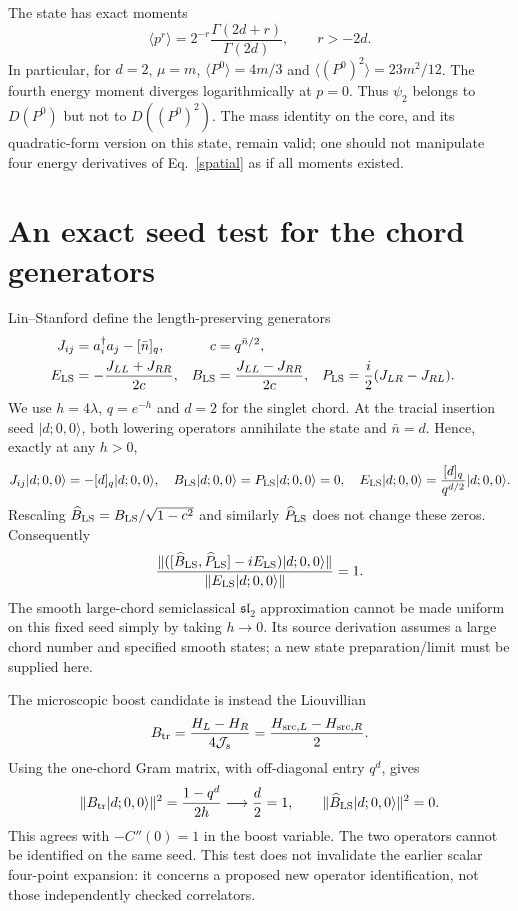 \documentclass[11pt,a4paper]{article}
\newcommand{\Js}{\mathcal J_s}
\begin{document}
The state has exact moments
\begin{equation}
 \langle p^r\rangle=2^{-r}\frac{\Gamma(2d+r)}{\Gamma(2d)},
 \qquad r>-2d.
\end{equation}
In particular, for $d=2$, $\mu=m$,
$\langle P^0\rangle=4m/3$ and
$\langle(P^0)^2\rangle=23m^2/12$. The fourth energy moment diverges
logarithmically at $p=0$. Thus $\psi_2$ belongs to $D(P^0)$ but not to
$D((P^0)^2)$. The mass identity on the core, and its quadratic-form
version on this state, remain valid; one should not manipulate four
energy derivatives of Eq.~\eqref{spatial} as if all moments existed.

\newpage
\section{An exact seed test for the chord generators}
Lin--Stanford define the length-preserving generators \cite{lin}
\begin{align}
 J_{ij}&=a_i^\dagger a_j-[\bar n]_q,&c&=q^{\bar n/2},\notag\\
 E_{\rm LS}&=-\frac{J_{LL}+J_{RR}}{2c},&
 B_{\rm LS}&=\frac{J_{LL}-J_{RR}}{2c},&
 P_{\rm LS}&=\frac{i}{2}(J_{LR}-J_{RL}).
\end{align}
We use $h=4\lambda$, $q=e^{-h}$ and $d=2$ for the singlet chord.
At the tracial insertion seed $|d;0,0\rangle$, both lowering operators
annihilate the state and $\bar n=d$. Hence, exactly at any $h>0$,
\begin{equation}
 J_{ij}|d;0,0\rangle=-[d]_q|d;0,0\rangle,\quad
 B_{\rm LS}|d;0,0\rangle=P_{\rm LS}|d;0,0\rangle=0,\quad
 E_{\rm LS}|d;0,0\rangle=\frac{[d]_q}{q^{d/2}}|d;0,0\rangle.
\end{equation}
Rescaling $\widehat B_{\rm LS}=B_{\rm LS}/\sqrt{1-c^2}$ and similarly
$\widehat P_{\rm LS}$ does not change these zeros. Consequently
\begin{equation}
 \frac{\|([\widehat B_{\rm LS},\widehat P_{\rm LS}]-iE_{\rm LS})|d;0,0\rangle\|}
 {\|E_{\rm LS}|d;0,0\rangle\|}=1.\label{defect}
\end{equation}
The smooth large-chord semiclassical $\mathfrak{sl}_2$ approximation
cannot be made uniform on this fixed seed simply by taking $h\to0$.
Its source derivation assumes a large chord number and specified smooth
states; a new state preparation/limit must be supplied here.

The microscopic boost candidate is instead the Liouvillian
\begin{equation}
 B_{\rm tr}=\frac{H_L-H_R}{4\Js}
 =\frac{H_{{\rm src},L}-H_{{\rm src},R}}2.
\end{equation}
Using the one-chord Gram matrix, with off-diagonal entry $q^d$, gives
\begin{equation}
 \|B_{\rm tr}|d;0,0\rangle\|^2=\frac{1-q^d}{2h}\longrightarrow\frac d2=1,
 \qquad\|\widehat B_{\rm LS}|d;0,0\rangle\|^2=0.\label{variance}
\end{equation}
This agrees with $-C''(0)=1$ in the boost variable. The two operators
cannot be identified on the same seed. This test does not invalidate
the earlier scalar four-point expansion: it concerns a proposed new
operator identification, not those independently checked correlators.
\end{document}
